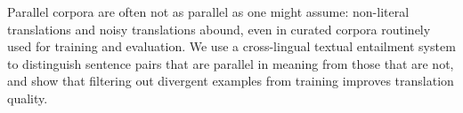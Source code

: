 Parallel corpora are often not as parallel as one might assume: non-literal translations and noisy translations abound, even in curated corpora routinely used for training and evaluation. We use a cross-lingual textual entailment system to distinguish sentence pairs that are parallel in meaning from those that are not, and show that filtering out divergent examples from training improves translation quality.

